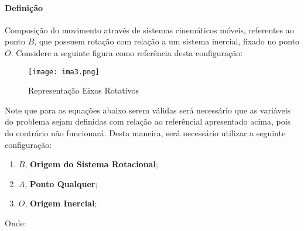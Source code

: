 \documentclass{article}
\begin{document}
            \paragraph{Definição}Composição do movimento através de sistemas cinemáticos móveis, referentes ao ponto $B$, que possuem rotação com relação a um sistema inercial, fixado no ponto $O$. Considere a seguinte figura como referência desta configuração:
                \begin{figure}[H]
                    \centering
                    \texttt{[image: ima3.png]}
                    \caption{Representação Eixos Rotativos}
                \end{figure} \noindent
            Note que para as equações abaixo serem válidas será necessário que as variáveis do problema sejam definidas com relação ao referêncial apresentado acima, pois do contrário não funcionará. Desta maneira, será necessário utilizar a seguinte configuração:
                \begin{enumerate}[noitemsep]
                    \item $B$, \textbf{Origem do Sistema Rotacional};
                    \item $A$, \textbf{Ponto Qualquer};
                    \item $O$, \textbf{Origem Inercial};
                \end{enumerate}
            Onde:
\end{document}
